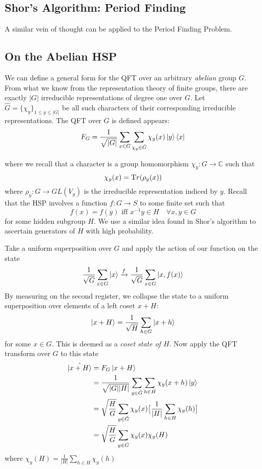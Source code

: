 \documentclass{../quantum.tex}
\begin{document}
\subsection{Shor's Algorithm: Period Finding}
A similar vein of thought can be applied to the Period Finding Problem.


\subsection{On the Abelian HSP}

We can define a general form for the QFT over an arbitrary \textit{abelian} group $G$. From what we know from the representation theory of finite groups, there are exactly $|G|$ irreducible representations of degree one over $G$. Let $\hat{G} = \{\chi_y\}_{1 \leq y \leq |G|}$ be all such characters of their corresponding irreducible representations. The QFT over $G$ is defined appears:
%
\begin{equation}
  F_{G} = \frac{1}{\sqrt{|G|}}\sum_{x \in G}\sum_{\chi_y \in \hat{G}} \chi_y(x) \ket{y}\bra{x}
\end{equation}

where we recall that a character is a group homomorphism $\chi_y: G \rightarrow \mathbb{C}$ such that
$$ \chi_y(x) = {\text Tr}(\rho_y(x)) $$ where $\rho_y : G \rightarrow GL(V_y)$ is the irreducible representation indiced by $y$.
%
Recall that the HSP involves a function $f: G \rightarrow S$ to some finite set such that
%
$$ f(x) = f(y) \text{ iff } x^{-1}y \in H \quad \forall x,y \in G$$ for some hidden subgroup $H$. We use a similar idea found in Shor's algorithm to ascertain generators of $H$ with high probability.
%

Take a uniform superposition over $G$ and apply the action of our function on the state
%
\begin{equation}
  \frac{1}{\sqrt{G}}\sum_{x \in G} \ket{x} \xrightarrow{f} \frac{1}{\sqrt{G}}\sum_{x \in G} \ket{x, f(x)}
\end{equation}
By measuring on the second register, we collapse the state to a uniform superposition over elements of a left coset $x + H$:
%
\begin{equation}
  \ket{x + H} = \frac{1}{\sqrt{H}} \sum_{h \in G} \ket{x + h}
\end{equation}
%
for some $x \in G$. This is deemed as a \textit{coset state of $H$}. Now apply the QFT transform over $G$ to this state
\begin{equation}
  \begin{split}
    \hat{\ket{x + H}}
    & = F_G\ket{x + H} \\
    & = \frac{1}{\sqrt{|G||H|}} \sum_{y \in \hat{G}} \sum_{h \in H} \chi_y(x + h) \ket{y} \\
    & = \sqrt{\frac{H}{G}}\sum_{y \in \hat{G}}\chi_y(x)\big[ \frac{1}{|H|} \sum_{h \in H} \chi_y(h)\big] \\
    & = \sqrt{\frac{H}{G}}\sum_{y \in \hat{G}}\chi_y(x)\chi_y(H)
  \end{split}
\end{equation}
where
$\chi_y(H) = \frac{1}{|H|} \sum_{h \in H} \chi_y(h)$
\end{document}
